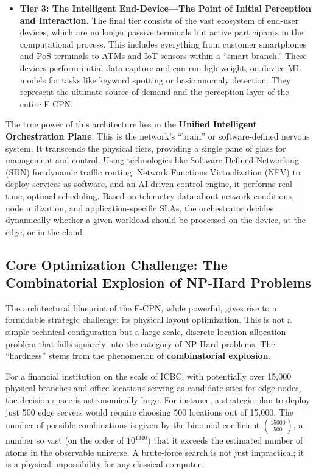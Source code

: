 \documentclass[11pt,a4paper]{article}
\begin{document}
\begin{itemize}
  \item \textbf{Tier 3: The Intelligent End-Device---The Point of Initial Perception and Interaction.} The final tier consists of the vast ecosystem of end-user devices, which are no longer passive terminals but active participants in the computational process. This includes everything from customer smartphones and PoS terminals to ATMs and IoT sensors within a ``smart branch.'' These devices perform initial data capture and can run lightweight, on-device ML models for tasks like keyword spotting or basic anomaly detection. They represent the ultimate source of demand and the perception layer of the entire F-CPN.
\end{itemize}

The true power of this architecture lies in the \textbf{Unified Intelligent Orchestration Plane}. This is the network's ``brain'' or software-defined nervous system. It transcends the physical tiers, providing a single pane of glass for management and control. Using technologies like Software-Defined Networking (SDN) for dynamic traffic routing, Network Functions Virtualization (NFV) to deploy services as software, and an AI-driven control engine, it performs real-time, optimal scheduling. Based on telemetry data about network conditions, node utilization, and application-specific SLAs, the orchestrator decides dynamically whether a given workload should be processed on the device, at the edge, or in the cloud.

\subsection{Core Optimization Challenge: The Combinatorial Explosion of NP-Hard Problems}

The architectural blueprint of the F-CPN, while powerful, gives rise to a formidable strategic challenge: its physical layout optimization. This is not a simple technical configuration but a large-scale, discrete location-allocation problem that falls squarely into the category of NP-Hard problems. The ``hardness'' stems from the phenomenon of \textbf{combinatorial explosion}.

For a financial institution on the scale of ICBC, with potentially over 15,000 physical branches and office locations serving as candidate sites for edge nodes, the decision space is astronomically large. For instance, a strategic plan to deploy just 500 edge servers would require choosing 500 locations out of 15,000. The number of possible combinations is given by the binomial coefficient $\binom{15000}{500}$, a number so vast (on the order of $10^{1340}$) that it exceeds the estimated number of atoms in the observable universe. A brute-force search is not just impractical; it is a physical impossibility for any classical computer.
\end{document}
